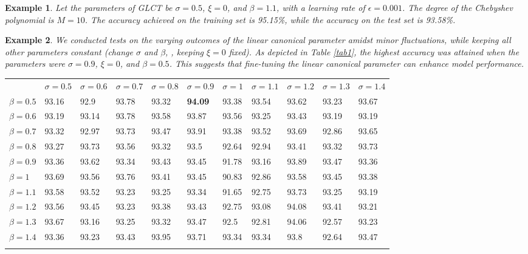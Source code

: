 \documentclass[lettersize,journal]{IEEEtran}
\newtheorem{example}{Example}
\begin{document}
\begin{example}
	Let the parameters of GLCT be $\sigma=0.5$, $\xi=0$, and $\beta=1.1$, with a learning rate of $\epsilon=0.001$. The degree of the Chebyshev polynomial is $M=10$.
	The accuracy achieved on the training set is 95.15\%, while the accuracy on the test set is 93.58\%.
\end{example}

\begin{example}
	We conducted tests on the varying outcomes of the linear canonical parameter amidst minor fluctuations, while keeping all other parameters constant (change $\sigma$ and $\beta$, , keeping $\xi = 0$ fixed). As depicted in Table \ref{tab1}, the highest accuracy was attained when the parameters were $\sigma=0.9$, $\xi=0$, and $\beta=0.5$. This suggests that fine-tuning the linear canonical parameter can enhance model performance.
\end{example}



\begin{table*}[h]%
	\centering
	\caption{Prediction Results of Test Set with Different Parameters (\%)}
	\label{tab1}  
	\begin{tabular}{l l l l l l l l l l l}%
		\hline\hline\noalign{\smallskip}	
		 &  $\sigma=0.5$  & $\sigma=0.6$ & $\sigma=0.7$ & $\sigma=0.8$ & $\sigma=0.9$ & $\sigma=1$ & $\sigma=1.1$ & $\sigma=1.2$ & $\sigma=1.3$ & $\sigma=1.4$   \\
		\noalign{\smallskip}\hline\noalign{\smallskip}
		$\beta=0.5$ & 93.16  & 92.9 & 93.78 & 93.32 & \textbf{94.09} & 93.38 & 93.54 & 93.62 & 93.23 & 93.67 \\
		$\beta=0.6$ & 93.19  & 93.14 & 93.78 & 93.58 & 93.87 & 93.56 & 93.25 & 93.43 & 93.19 & 93.19 \\
		$\beta=0.7$ & 93.32  & 92.97 & 93.73 & 93.47 & 93.91 & 93.38 & 93.52 & 93.69 & 92.86 & 93.65 \\
		$\beta=0.8$ & 93.27  & 93.73 & 93.56 & 93.32 & 93.5 & 92.64 & 92.94 & 93.41 & 93.32 & 93.73 \\
		$\beta=0.9$ & 93.36  & 93.62 & 93.34 & 93.43 & 93.45 & 91.78 & 93.16 & 93.89 & 93.47 & 93.36 \\
		$\beta=1$ & 93.69  & 93.56 & 93.76 & 93.41 & 93.45 & 90.83 & 92.86 & 93.58 & 93.45 & 93.38 \\
		$\beta=1.1$ & 93.58  & 93.52 & 93.23 & 93.25 & 93.34 & 91.65 & 92.75 & 93.73 & 93.25 & 93.19 \\
		$\beta=1.2$ & 93.56  & 93.45 & 93.23 & 93.38 & 93.43 & 92.75 & 93.08 & 94.08 & 93.41 & 93.21 \\
		$\beta=1.3$ & 93.67  & 93.16 & 93.25 & 93.32 & 93.47 & 92.5 & 92.81 & 94.06 & 92.57 & 93.23 \\
		$\beta=1.4$ & 93.36  & 93.23 & 93.43 & 93.95 & 93.71 & 93.34 & 93.34 & 93.8 & 92.64 & 93.47 \\
		\noalign{\smallskip}\hline
	\end{tabular}
\end{table*}
\end{document}
